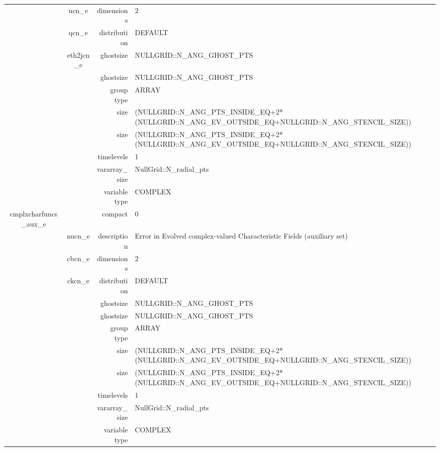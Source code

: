\begin{tabular*}{150mm}{|c|c@{\extracolsep{\fill}}|rl|}
 & ucn\_e & dimensions & 2 \\ 
 & qcn\_e & distribution & DEFAULT \\ 
 & eth2jcn\_e & ghostsize & NULLGRID::N\_ANG\_GHOST\_PTS \\ 
& ~ & ghostsize & NULLGRID::N\_ANG\_GHOST\_PTS \\ 
 &  & group type & ARRAY \\ 
 &  & size & (NULLGRID::N\_ANG\_PTS\_INSIDE\_EQ+2*(NULLGRID::N\_ANG\_EV\_OUTSIDE\_EQ+NULLGRID::N\_ANG\_STENCIL\_SIZE)) \\ 
& ~ & size & (NULLGRID::N\_ANG\_PTS\_INSIDE\_EQ+2*(NULLGRID::N\_ANG\_EV\_OUTSIDE\_EQ+NULLGRID::N\_ANG\_STENCIL\_SIZE)) \\ 
 &  & timelevels & 1 \\ 
 &  & vararray\_size & NullGrid::N\_radial\_pts \\ 
 &  & variable type & COMPLEX \\ 
\hline 
cmplxcharfuncs\_aux\_e &  & compact & 0 \\ 
 & nucn\_e & description & Error in Evolved complex-valued Characteristic Fields (auxiliary set) \\ 
 & cbcn\_e & dimensions & 2 \\ 
 & ckcn\_e & distribution & DEFAULT \\ 
 &  & ghostsize & NULLGRID::N\_ANG\_GHOST\_PTS \\ 
& ~ & ghostsize & NULLGRID::N\_ANG\_GHOST\_PTS \\ 
 &  & group type & ARRAY \\ 
 &  & size & (NULLGRID::N\_ANG\_PTS\_INSIDE\_EQ+2*(NULLGRID::N\_ANG\_EV\_OUTSIDE\_EQ+NULLGRID::N\_ANG\_STENCIL\_SIZE)) \\ 
& ~ & size & (NULLGRID::N\_ANG\_PTS\_INSIDE\_EQ+2*(NULLGRID::N\_ANG\_EV\_OUTSIDE\_EQ+NULLGRID::N\_ANG\_STENCIL\_SIZE)) \\ 
 &  & timelevels & 1 \\ 
 &  & vararray\_size & NullGrid::N\_radial\_pts \\ 
 &  & variable type & COMPLEX \\ 
\hline 
\end{tabular*} 



\vspace{5mm}
\vspace{5mm}

